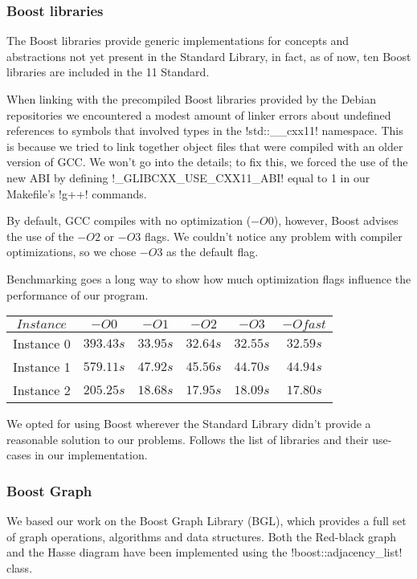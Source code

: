 \subsubsection{Boost libraries}\label{section:boost-libs}

The Boost libraries provide generic implementations for concepts and abstractions not yet present in the Standard Library, in fact, as of now, ten Boost libraries are included in the \cc{}11 Standard.

When linking with the precompiled Boost libraries provided by the Debian repositories we encountered a modest amount of linker errors about undefined references to symbols that involved types in the !std::__cxx11! namespace.
This is because we tried to link together object files that were compiled with an older version of GCC.
We won't go into the details; to fix this, we forced the use of the new ABI by defining !_GLIBCXX_USE_CXX11_ABI! equal to 1 in our Makefile's !g++! commands.

By default, GCC compiles with no optimization ($-O0$), however, Boost advises the use of the $-O2$ or $-O3$ flags.
We couldn't notice any problem with compiler optimizations, so we chose $-O3$ as the default flag.

Benchmarking goes a long way to show how much optimization flags influence the performance of our program.

\begin{center}
  \begin{tabular}{c | c c c c c}
    $Instance$ & $-O0$     & $-O1$    & $-O2$    & $-O3$    & $-Ofast$ \\
    \hline
    Instance 0 & $393.43s$ & $33.95s$ & $32.64s$ & $32.55s$ & $32.59s$ \\
    Instance 1 & $579.11s$ & $47.92s$ & $45.56s$ & $44.70s$ & $44.94s$ \\
    Instance 2 & $205.25s$ & $18.68s$ & $17.95s$ & $18.09s$ & $17.80s$
  \end{tabular}
\end{center}

We opted for using Boost wherever the Standard Library didn't provide a reasonable solution to our problems.
Follows the list of libraries and their use-cases in our implementation.

\subsubsection*{Boost Graph}

We based our work on the Boost Graph Library (BGL), which provides a full set of graph operations, algorithms and data structures.
Both the Red-black graph and the Hasse diagram have been implemented using the !boost::adjacency_list! class.

